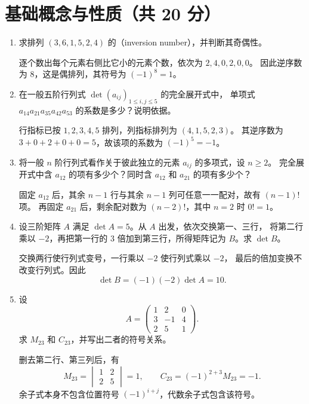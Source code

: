 \documentclass[UTF8,12pt,a4paper,fontset=fandol]{ctexart}
\begin{document}
\section{基础概念与性质（共 20 分）}
\begin{enumerate}[label=\arabic*.,series=detquestions]

\item\label{q:inversions}
求排列 $(3,6,1,5,2,4)$ 的（inversion number），并判断其奇偶性。
\begin{solve}
逐个数出每个元素右侧比它小的元素个数，依次为 $2,4,0,2,0,0$。
因此逆序数为 $8$，这是偶排列，其符号为 $(-1)^8=1$。
\end{solve}

\item\label{q:term-sign}
在一般五阶行列式 $\det(a_{ij})_{1\leq i,j\leq5}$ 的完全展开式中，
单项式 $a_{14}a_{21}a_{35}a_{42}a_{53}$ 的系数是多少？说明依据。
\begin{solve}
行指标已按 $1,2,3,4,5$ 排列，列指标排列为 $(4,1,5,2,3)$。
其逆序数为 $3+0+2+0+0=5$，故该项的系数为 $(-1)^5=-1$。
\end{solve}

\item\label{q:count-terms}
将一般 $n$ 阶行列式看作关于彼此独立的元素 $a_{ij}$ 的多项式，设 $n\geq2$。
完全展开式中含 $a_{12}$ 的项有多少个？同时含 $a_{12}$ 和 $a_{21}$ 的项有多少个？
\begin{solve}
固定 $a_{12}$ 后，其余 $n-1$ 行与其余 $n-1$ 列可任意一一配对，故有 $(n-1)!$ 项。
再固定 $a_{21}$ 后，剩余配对数为 $(n-2)!$，其中 $n=2$ 时 $0!=1$。
\end{solve}

\item\label{q:row-operations}
设三阶矩阵 $A$ 满足 $\det A=5$。从 $A$ 出发，依次交换第一、三行，
将第二行乘以 $-2$，再把第一行的 $3$ 倍加到第三行，所得矩阵记为 $B$。求 $\det B$。
\begin{solve}
交换两行使行列式变号，一行乘以 $-2$ 使行列式乘以 $-2$，
最后的倍加变换不改变行列式。因此
\[
\det B=(-1)(-2)\det A=10.
\]
\end{solve}

\item\label{q:minor-cofactor}
设
\[
A=\begin{pmatrix}1&2&0\\3&-1&4\\2&5&1\end{pmatrix}.
\]
求 $M_{23}$ 和 $C_{23}$，并写出二者的符号关系。
\begin{solve}
删去第二行、第三列后，有
\[
M_{23}=\begin{vmatrix}1&2\\2&5\end{vmatrix}=1,
\qquad C_{23}=(-1)^{2+3}M_{23}=-1.
\]
余子式本身不包含位置符号 $(-1)^{i+j}$，代数余子式包含该符号。
\end{solve}


\end{enumerate}
\end{document}
